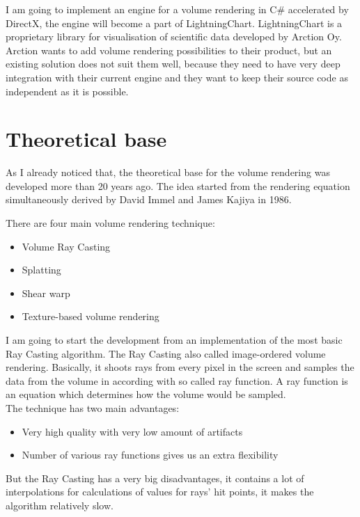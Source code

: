 \documentclass[english]{article}
\begin{document}
I am going to implement an engine for a volume rendering in C\# accelerated by DirectX, the engine will become a part of LightningChart. LightningChart is a proprietary library for visualisation of scientific data developed by Arction Oy. Arction wants to add volume rendering possibilities to their product, but an existing solution does not suit them well, because they need to have very deep integration with their current engine and they want to keep their source code as independent as it is possible.

\section{Theoretical base}

As I already noticed that, the theoretical base for the volume rendering was developed more than 20 years ago. The idea started from the rendering equation simultaneously derived by David Immel and James Kajiya in 1986.

There are four main volume rendering technique:
\begin{itemize}
\item Volume Ray Casting
\item Splatting
\item Shear warp
\item Texture-based volume rendering
\end{itemize}

I am going to start the development from an implementation of the most basic Ray Casting algorithm. The Ray Casting also called image-ordered volume rendering. Basically, it shoots rays from every pixel in the screen and samples the data from the volume in according with so called ray function. A ray function is an equation which determines how the volume would be sampled.\\

The technique has two main advantages:
\begin{itemize}
\item Very high quality with very low amount of artifacts
\item Number of various ray functions gives us an extra flexibility
\end{itemize}

But the Ray Casting has a very big disadvantages, it contains a lot of interpolations for calculations of values for rays' hit points, it makes the algorithm relatively slow.\\
\end{document}
